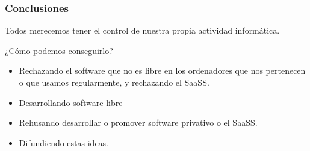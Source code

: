 \documentclass[12pt]{beamer}
\begin{document}
\begin{frame}
  \frametitle{Conclusiones}
  \begin{block}{}
    Todos merecemos tener el control de nuestra propia actividad informática.
  \end{block}
  \begin{block}{¿Cómo podemos conseguirlo?}
    \begin{itemize}
    \item Rechazando el software que no es libre en los ordenadores que nos pertenecen o que usamos
      regularmente, y rechazando el SaaSS.
    \item Desarrollando software libre
    \item Rehusando desarrollar o promover software privativo o el SaaSS.
    \item Difundiendo estas ideas.
    \end{itemize}
  \end{block}

\end{frame}
\end{document}
